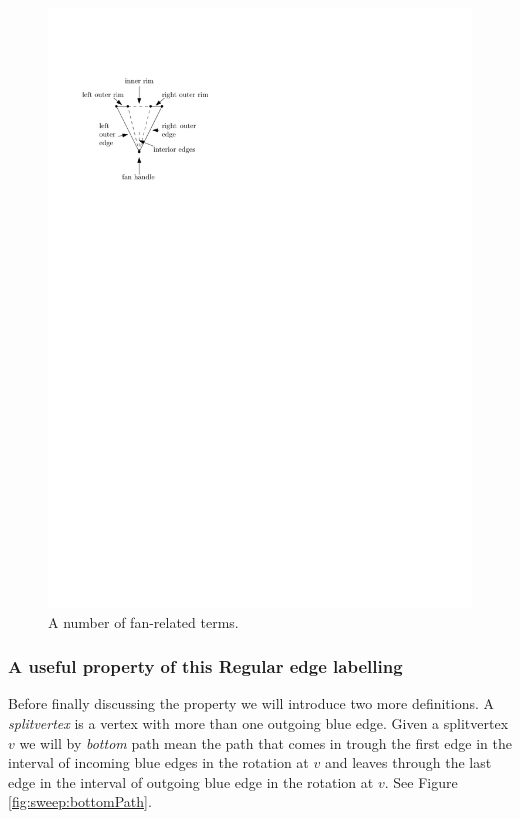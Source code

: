      \begin{figure}[h]
       \centering
       \includegraphics[scale=1]{rectangularDuals/img/fanterms}
       \caption{A number of fan-related terms.}
       \label{fig:rect:fanTerms}
     \end{figure}

\subsubsection{A useful property of this Regular edge labelling}
  Before finally discussing the property we will introduce two more definitions.
  A \emph{splitvertex} is a vertex with more than one outgoing blue edge.
  Given a splitvertex $v$ we will by \emph{bottom} path mean the path that comes in trough the first edge in the interval of incoming blue edges in the rotation at $v$ and leaves through the last edge in the interval of outgoing blue edge in the rotation at $v$.
  See Figure \ref{fig:sweep:bottomPath}.

